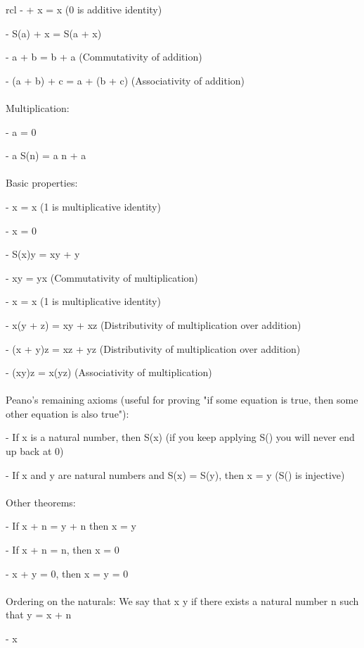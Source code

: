 \documentclass{article}
\begin{document}
\begin{arrary}{rcl}
-  + x = x\) (0 is additive identity)

- \math S(a) + x = S(a + x)\)

- \math a + b = b + a\) (Commutativity of addition)

- \math (a + b) + c = a + (b + c)\) (Associativity of addition)
\\
\\
Multiplication:

- \math a  = 0\)

- \math a \times S(n) = a \times n + a\)
\\
\\
\newline Basic properties:

- \math x  = x\) (1 is multiplicative identity)

-  \times x = 0\)

- \math S(x)y = xy + y\)

- \math xy = yx\) (Commutativity of multiplication)

-  \times x = x\) (1 is multiplicative identity)

- \math x(y + z) = xy + xz\) (Distributivity of multiplication over addition)

- \math (x + y)z = xz + yz\) (Distributivity of multiplication over addition)

- \math (xy)z = x(yz)\) (Associativity of multiplication)
\\
\\
Peano's remaining axioms (useful for proving "if some equation is true, then some other equation is also true"):

- If x is a natural number, then \math S(x) \) (if you keep applying S() you will never end up back at 0)

- If x and y are natural numbers and \math S(x) = S(y)\), then \math x = y\) (\math S()\) is injective)
\\
\\
Other theorems:

- If \math x + n = y + n\) then \math x = y\)

- If \math x + n = n\), then \math x = 0\)

- \math x + y = 0\), then \math x = y = 0\)
\\
\\
Ordering on the naturals: We say that \math x \leq y\) if there exists a natural number n such that \math y = x + n\)

-  \leq x\)


\end{arrary}
\end{document}

